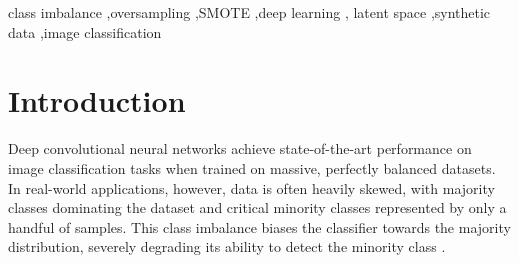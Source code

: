 \documentclass[5p,times]{elsarticle}
\begin{document}
\begin{frontmatter}

\begin{keyword}
class imbalance \sep oversampling \sep SMOTE \sep deep learning \sep
latent space \sep synthetic data \sep image classification
\end{keyword}

\end{frontmatter}

\section{Introduction}
\label{sec:intro}
Deep convolutional neural networks achieve state-of-the-art performance on image classification tasks when trained on massive, perfectly balanced datasets. In real-world applications, however, data is often heavily skewed, with majority classes dominating the dataset and critical minority classes represented by only a handful of samples. This class imbalance biases the classifier towards the majority distribution, severely degrading its ability to detect the minority class \citep{he2009learning,johnson2019survey}. 
\end{document}
